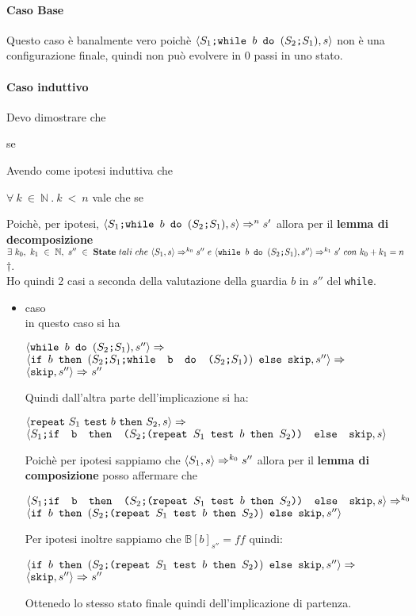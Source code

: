 {   \paragraph{Caso Base}
	 Questo caso è banalmente vero poichè $\confSs{\PDef{}}{s}$
	non è una configurazione finale, quindi non può evolvere in 0 passi in uno
	stato.
    \paragraph{Caso induttivo}
	Devo dimostrare che 
	\begin{center}
	se 
	\end{center}
	Avendo come ipotesi induttiva che 
	\begin{center}
	$\forall{}~k~\in~\mathbb{N}~.~k~<~n$ vale che se 
	\end{center}
	Poichè, per ipotesi, $\confSs{\PDef{}}{s}\Rar{n}s'$ allora per il
	\textbf{lemma di decomposizione} \\ 
	$\exists{}~k_0,~k_1~\in~\mathbb{N},~
	s''~\in~\states{}~tali~che~\confSs{S_1}{s}\Rar{k_0}s''~e~\confSs{
	\wbS{b}{(\concat{$S_2$}{$S_1$})}}{s''}\Rar{k_1}s'~con~k_0+k_1=n$  $\dagger $.\\
	Ho quindi 2 casi a seconda della valutazione della guardia $b$ in $s''$ del
	\texttt{while}.
	\begin{itemize}
		\item caso  \\
		in questo caso si ha 
		\begin{center}
		$\confSs{\wbS{b}{(\concat{$S_2$}{$S_1$})}}{s''}\Rar{}$\\
		$\confSs{\ifABC{b}{(\concat{\concat{$S_2$}{$S_1$}}
		{\wbS{b}{(\concat{$S_2$}{$S_1$})}})}{\skipistr}}{s''}\Rar{}$\\
		$\confSs{\skipistr}{s''}\Rar{}s''$
		\end{center}
		Quindi dall'altra parte dell'implicazione si ha:
		\begin{center}
		$\confSs{\repeatSbS{S_1}{b}{S_2}}{s}\Rar{}$\\
		$\confSs{\concat{$S_1$}{\ifABC{b}{(\concat{$S_2$}
		{(\repeatSbS{$S_1$}{$b$}{$S_2$})})}{\skipistr}}}{s}$
		\end{center}
		Poichè per ipotesi sappiamo che $\confSs{S_1}{s}\Rar{k_0}s''$ allora
		per il \textbf{lemma di composizione} posso affermare che
		\begin{center}
		$\confSs{\concat{$S_1$}{\ifABC{b}{(\concat{$S_2$}
		{(\repeatSbS{$S_1$}{$b$}{$S_2$})})}{\skipistr}}}{s}\Rar{k_0}$\\
		$\confSs{
			\ifABC{b}{(\concat{$S_2$}{(\repeatSbS{$S_1$}{$b$}{$S_2$})})} 
			{\skipistr}}{s''}$
		\end{center}
		Per ipotesi inoltre sappiamo che $\mathbb{B}[b]_{s''}=ff$ quindi:
		\begin{center}
		$\confSs{
			\ifABC{b}{(\concat{$S_2$}{(\repeatSbS{$S_1$}{$b$}{$S_2$})})} 
			{\skipistr}}{s''}\Rar{}$\\
		$\confSs{\skipistr}{s''}\Rar{}s''$
		\end{center}
		Ottenedo lo stesso stato finale quindi dell'implicazione di partenza.


\end{itemize}}
